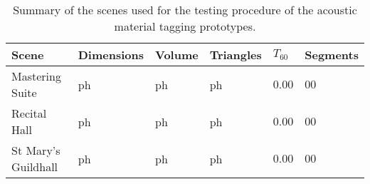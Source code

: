 \begin{table}[]
\centering
\begin{tabular}{@{}llllll@{}}
\toprule
Scene               & Dimensions & Volume & Triangles & $T_{60}$ & Segments \\ \midrule
Mastering Suite     & ph         & ph     & ph        & $0.00$   & $00$ \\
Recital Hall        & ph         & ph     & ph        & $0.00$   & $00$ \\
St Mary's Guildhall & ph         & ph     & ph        & $0.00$   & $00$ \\ \bottomrule
\end{tabular}
\caption{Summary of the scenes used for the testing procedure of the acoustic material tagging prototypes.}
\label{tab:material-eval-scenes}
\end{table}